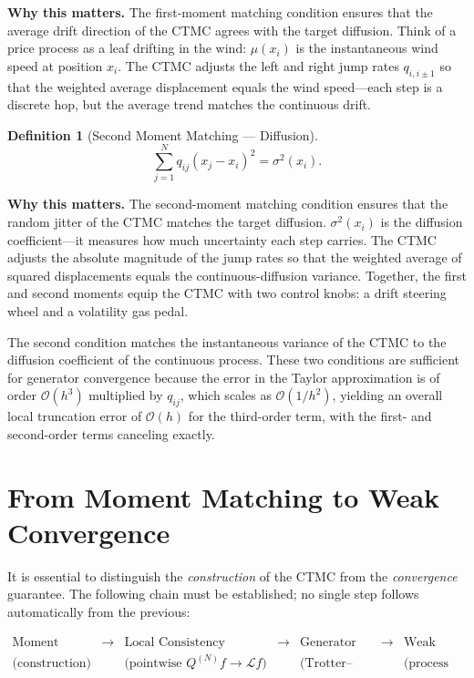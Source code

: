 \documentclass[11pt,a4paper,openany]{book}
\theoremstyle{definition}
\newtheorem{definition}{Definition}[chapter]
\theoremstyle{plain}
\theoremstyle{remark}
\newcommand{\1}{\mathbbm{1}}
\begin{document}
\medskip
\noindent\textbf{Why this matters.} The first-moment matching condition ensures that the average drift direction of the CTMC agrees with the target diffusion. Think of a price process as a leaf drifting in the wind: $\mu(x_i)$ is the instantaneous wind speed at position $x_i$. The CTMC adjusts the left and right jump rates $q_{i,i\pm 1}$ so that the weighted average displacement equals the wind speed---each step is a discrete hop, but the average trend matches the continuous drift.

\begin{definition}[Second Moment Matching --- Diffusion]
\[
\boxed{\sum_{j=1}^{N} q_{ij} (x_{j} - x_{i})^{2} = \sigma^{2}(x_{i})}.
\]
\end{definition}

\medskip
\noindent\textbf{Why this matters.} The second-moment matching condition ensures that the random jitter of the CTMC matches the target diffusion. $\sigma^2(x_i)$ is the diffusion coefficient---it measures how much uncertainty each step carries. The CTMC adjusts the absolute magnitude of the jump rates so that the weighted average of squared displacements equals the continuous-diffusion variance. Together, the first and second moments equip the CTMC with two control knobs: a drift steering wheel and a volatility gas pedal.

The second condition matches the instantaneous variance of the CTMC to the diffusion coefficient of the continuous process. These two conditions are sufficient for generator convergence because the error in the Taylor approximation is of order $\mathcal{O}(h^{3})$ multiplied by $q_{ij}$, which scales as $\mathcal{O}(1/h^{2})$, yielding an overall local truncation error of $\mathcal{O}(h)$ for the third-order term, with the first- and second-order terms canceling exactly.

\section{From Moment Matching to Weak Convergence}

It is essential to distinguish the \emph{construction} of the CTMC from the \emph{convergence} guarantee. The following chain must be established; no single step follows automatically from the previous:

\[
\boxed{\begin{array}{ccccccc}
\text{Moment Matching} & \longrightarrow & \text{Local Consistency} & \longrightarrow & \text{Generator Convergence} & \longrightarrow & \text{Weak Convergence} \\[4pt]
\text{(construction)} & & \text{(pointwise } Q^{(N)}f \to \mathcal{L}f\text{)} & & \text{(Trotter--Kato)} & & \text{(process law)}
\end{array}}
\]
\end{document}
